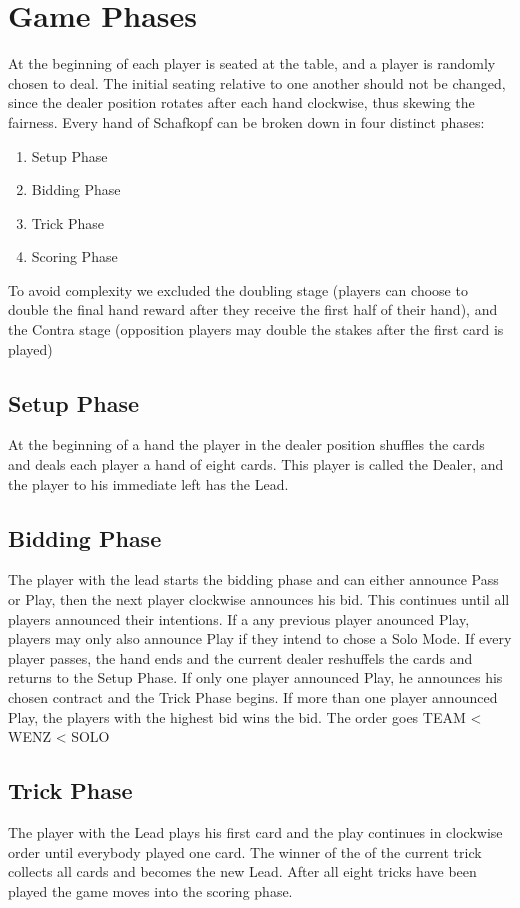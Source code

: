 \section{Game Phases}
At the beginning of each player is seated at the table, and a player is randomly chosen to deal.
The initial seating relative to one another should not be changed, since the dealer position rotates after each hand
clockwise, thus
skewing the fairness.
\newline
Every hand of Schafkopf can be broken down in four distinct phases:
\begin{enumerate}
    \item Setup Phase
    \item Bidding Phase
    \item Trick Phase
    \item Scoring Phase
\end{enumerate}
To avoid complexity we excluded the doubling stage (players can choose to double the final hand reward after they
receive the first half of their hand), and the Contra stage (opposition players may double the stakes after the first card is played)
\subsection{Setup Phase}
At the beginning of a hand the player in the dealer position shuffles the cards and deals each player a hand of eight
cards.
This player is called the Dealer, and the player to his immediate left has the Lead.
\subsection{Bidding Phase}
The player with the lead starts the bidding phase and can either announce Pass or Play, then the next player clockwise announces his bid.
This continues until all players announced their intentions.
If a any previous player anounced Play, players may only also announce Play if they intend to chose a Solo Mode.
If every player passes, the hand ends and the current dealer reshuffels the cards and returns to
the Setup Phase.
If only one player announced Play, he announces his chosen contract and the Trick Phase begins.
If more than one player announced Play, the players with the highest bid wins the bid.
The order goes TEAM < WENZ < SOLO
\subsection{Trick Phase}
The player with the Lead plays his first card and the play continues in clockwise order until everybody played one
card.
The winner of the of the current trick collects all cards and becomes the new Lead.
After all eight tricks have been played the game moves into the scoring phase.
